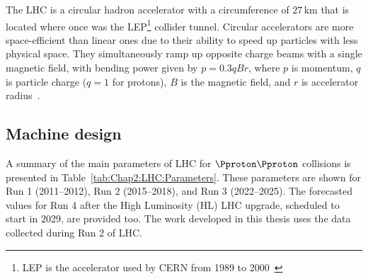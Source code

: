 The LHC is a circular hadron accelerator with a circumference of $27\,$km that is 
located where once was the LEP\footnote{LEP is the accelerator used 
by CERN from 1989 to 2000~\cite{Myers226776}} collider tunnel.
Circular accelerators are more space-efficient than linear ones due to their ability to speed up 
particles with less physical space. They simultaneously ramp up opposite charge beams with 
a single magnetic field, with bending power given by $p=0.3qBr$, 
where $p$ is momentum, $q$ is particle charge ($q=1$ for protons), $B$ is the
magnetic field, and $r$ is accelerator radius~\cite{Wilson:2743947}.


\subsection{Machine design}

A summary of the main parameters of LHC for $\Pproton\Pproton$ collisions 
is presented in Table~\ref{tab:Chap2:LHC:Parameters}. These parameters are shown for 
Run 1 (2011--2012), Run 2 (2015--2018), and Run 3 (2022--2025).
The forecasted values for Run 4 after the High Luminosity (HL) LHC upgrade, scheduled to start in 2029, are provided too.
The work developed in this thesis uses the data collected during Run 2 of LHC.


